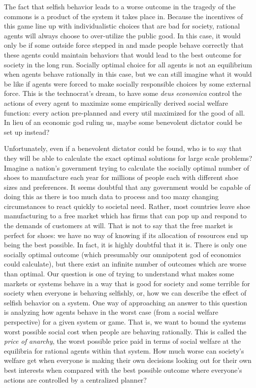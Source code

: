 \documentclass[12pt,twoside]{reedthesis}
\begin{document}
The fact that selfish behavior leads to a worse outcome in the tragedy of the commons is a product of the system it takes place in. Because the incentives of this game line up with individualistic choices that are bad for society, rational agents will always choose to over-utilize the public good. In this case, it would only be if some outside force stepped in and made people behave correctly that these agents could maintain behaviors that would lead to the best outcome for society in the long run. Socially optimal choice for all agents is not an equilibrium when agents behave rationally in this case, but we can still imagine what it would be like if agents were forced to make socially responsible choices by some external force. This is the technocrat's dream, to have some {\em deus economica} control the actions of every agent to maximize some empirically derived social welfare function: every action pre-planned and every util maximized for the good of all. In lieu of an economic god ruling us, maybe some benevolent dictator could be set up instead? 

Unfortunately, even if a benevolent dictator could be found, who is to say that they will be able to calculate the exact optimal solutions for large scale problems? Imagine a nation's government trying to calculate the socially optimal number of shoes to manufacture each year for millions of people each with different shoe sizes and preferences. It seems doubtful that any government would be capable of doing this as there is too much data to process and too many changing circumstances to react quickly to societal need. Rather, most countries leave shoe manufacturing to a free market which has firms that can pop up and respond to the demands of customers at will. That is not to say that the free market is perfect for shoes: we have no way of knowing if its allocation of resources end up being the best possible. In fact, it is highly doubtful that it is. There is only one socially optimal outcome (which presumably our omnipotent god of economics could calculate), but there exist an infinite number of outcomes which are worse than optimal. Our question is one of trying to understand what makes some markets or systems behave in a way that is good for society and some terrible for society when everyone is behaving selfishly, or, how we can describe the effect of selfish behavior on a system. One way of approaching an answer to this question is analyzing how agents behave in the worst case (from a social welfare perspective) for a given system or game. That is, we want to bound the systems worst possible social cost when people are behaving rationally. This is called the {\em price of anarchy}, the worst possible price paid in terms of social welfare at the equilibria for rational agents within that system. How much worse can society's welfare get when everyone is making their own decisions looking out for their own best interests when compared with the best possible outcome where everyone's actions are controlled by a centralized planner? 
\end{document}
